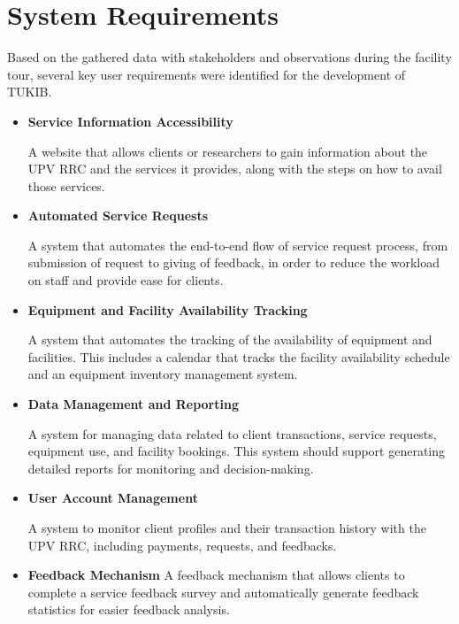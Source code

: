 \section{System Requirements}

Based on the gathered data with stakeholders and observations during the facility tour, several key user requirements were identified for the development of TUKIB. 

\begin{itemize}
	\item \textbf{Service Information Accessibility}
	
	A website that allows clients or researchers to gain information about the UPV RRC and the services it provides, along with the steps on how to avail those services. 
	
	\item \textbf{Automated Service Requests}
	
	A system that automates the end-to-end flow of service request process, from submission of request to giving of feedback, in order to reduce the workload on staff and provide ease for clients.
	
	\item \textbf{Equipment and Facility Availability Tracking}
	
	A system that automates the tracking of the availability of equipment and facilities. This includes a calendar that tracks the facility availability schedule and an equipment inventory management system. 
	
	\item \textbf{Data Management and Reporting}
	
	A system for managing data related to client transactions, service requests, equipment use, and facility bookings. This system should support generating detailed reports for monitoring and decision-making.
	
	\item \textbf{User Account Management}
	
	A system to monitor client profiles and their transaction history with the UPV RRC, including payments, requests, and feedbacks.
	
	\item \textbf{Feedback Mechanism}
	A feedback mechanism that allows clients to complete a service feedback survey and automatically generate feedback statistics for easier feedback analysis.
	
\end{itemize}

